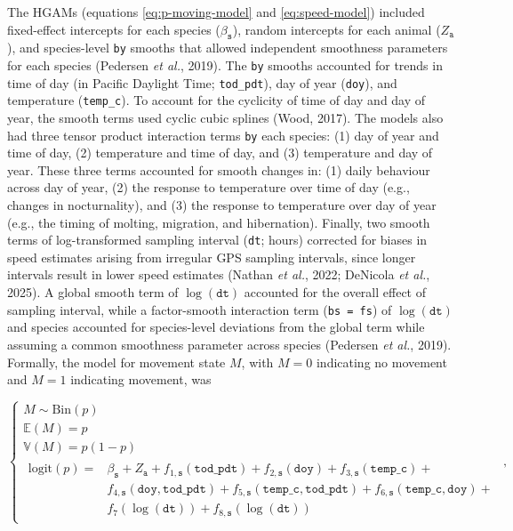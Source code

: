 \documentclass[
  12pt,
]{article}
\begin{document}
The HGAMs (equations \eqref{eq:p-moving-model} and \eqref{eq:speed-model}) included fixed-effect intercepts for each species (\(\beta_\texttt s\)), random intercepts for each animal (\(Z_\texttt{a}\)), and species-level \texttt{by} smooths that allowed independent smoothness parameters for each species (Pedersen \emph{et al.}, 2019). The \texttt{by} smooths accounted for trends in time of day (in Pacific Daylight Time; \texttt{tod\_pdt}), day of year (\texttt{doy}), and temperature (\texttt{temp\_c}). To account for the cyclicity of time of day and day of year, the smooth terms used cyclic cubic splines (Wood, 2017). The models also had three tensor product interaction terms \texttt{by} each species: (1) day of year and time of day, (2) temperature and time of day, and (3) temperature and day of year. These three terms accounted for smooth changes in: (1) daily behaviour across day of year, (2) the response to temperature over time of day (e.g., changes in nocturnality), and (3) the response to temperature over day of year (e.g., the timing of molting, migration, and hibernation). Finally, two smooth terms of log-transformed sampling interval (\texttt{dt}; hours) corrected for biases in speed estimates arising from irregular GPS sampling intervals, since longer intervals result in lower speed estimates (Nathan \emph{et al.}, 2022; DeNicola \emph{et al.}, 2025). A global smooth term of \(\log(\texttt{dt})\) accounted for the overall effect of sampling interval, while a factor-smooth interaction term (\texttt{bs\ =\ \textquotesingle{}fs\textquotesingle{}}) of \(\log(\texttt{dt})\) and species accounted for species-level deviations from the global term while assuming a common smoothness parameter across species (Pedersen \emph{et al.}, 2019). Formally, the model for movement state \(M\), with \(M = 0\) indicating no movement and \(M = 1\) indicating movement, was

\begin{equation}\label{eq:p-moving-model}
\begin{cases}
M \sim \text{Bin}(p) \\
\mathbb E(M) = p \\
\mathbb V(M) = p (1-p) \\
\begin{aligned}
\text{logit}(p) = & \beta_\texttt{s} + Z_\texttt{a} + f_{1,\texttt{s}}(\texttt{tod\_pdt}) + f_{2,\texttt s}(\texttt{doy}) + f_{3,\texttt s}(\texttt{temp\_c}) + \\
& f_{4,\texttt s}(\texttt{doy}, \texttt{tod\_pdt}) + f_{5, \texttt s}(\texttt{temp\_c}, \texttt{tod\_pdt}) + f_{6, \texttt s}(\texttt{temp\_c}, \texttt{doy}) + \\
& f_7(\log(\texttt{dt})) + f_{8,\texttt s}(\log(\texttt{dt}))
\end{aligned}
\end{cases},
\end{equation}
\end{document}
